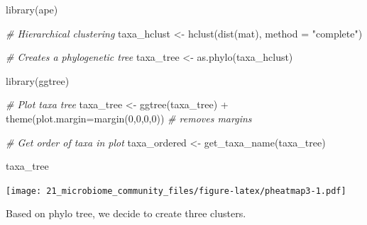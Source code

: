 \documentclass[
]{book}
\newenvironment{Shaded}{\begin{snugshade}}{\end{snugshade}}
\newcommand{\AttributeTok}[1]{\textcolor[rgb]{0.77,0.63,0.00}{#1}}
\newcommand{\CommentTok}[1]{\textcolor[rgb]{0.56,0.35,0.01}{\textit{#1}}}
\newcommand{\ConstantTok}[1]{\textcolor[rgb]{0.00,0.00,0.00}{#1}}
\newcommand{\DecValTok}[1]{\textcolor[rgb]{0.00,0.00,0.81}{#1}}
\newcommand{\FunctionTok}[1]{\textcolor[rgb]{0.00,0.00,0.00}{#1}}
\newcommand{\NormalTok}[1]{#1}
\newcommand{\OtherTok}[1]{\textcolor[rgb]{0.56,0.35,0.01}{#1}}
\newcommand{\SpecialCharTok}[1]{\textcolor[rgb]{0.00,0.00,0.00}{#1}}
\newcommand{\StringTok}[1]{\textcolor[rgb]{0.31,0.60,0.02}{#1}}
\begin{document}
\begin{Shaded}
\begin{Highlighting}[]
\FunctionTok{library}\NormalTok{(ape)}

\CommentTok{\# Hierarchical clustering}
\NormalTok{taxa\_hclust }\OtherTok{\textless{}{-}} \FunctionTok{hclust}\NormalTok{(}\FunctionTok{dist}\NormalTok{(mat), }\AttributeTok{method =} \StringTok{"complete"}\NormalTok{)}

\CommentTok{\# Creates a phylogenetic tree}
\NormalTok{taxa\_tree }\OtherTok{\textless{}{-}} \FunctionTok{as.phylo}\NormalTok{(taxa\_hclust)}
\end{Highlighting}
\end{Shaded}

\begin{Shaded}
\begin{Highlighting}[]
\FunctionTok{library}\NormalTok{(ggtree)}

\CommentTok{\# Plot taxa tree}
\NormalTok{taxa\_tree }\OtherTok{\textless{}{-}} \FunctionTok{ggtree}\NormalTok{(taxa\_tree) }\SpecialCharTok{+} 
  \FunctionTok{theme}\NormalTok{(}\AttributeTok{plot.margin=}\FunctionTok{margin}\NormalTok{(}\DecValTok{0}\NormalTok{,}\DecValTok{0}\NormalTok{,}\DecValTok{0}\NormalTok{,}\DecValTok{0}\NormalTok{)) }\CommentTok{\# removes margins}

\CommentTok{\# Get order of taxa in plot}
\NormalTok{taxa\_ordered }\OtherTok{\textless{}{-}} \FunctionTok{get\_taxa\_name}\NormalTok{(taxa\_tree)}

\NormalTok{taxa\_tree}
\end{Highlighting}
\end{Shaded}

\texttt{[image: 21\_microbiome\_community\_files/figure-latex/pheatmap3-1.pdf]}

Based on phylo tree, we decide to create three clusters.

\begin{Shaded}
\end{Shaded}
\end{document}
